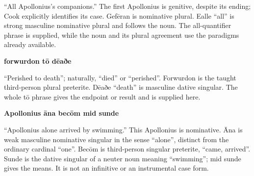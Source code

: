 “All Apollonius’s companions.” The first Apollonius is genitive, despite its ending; Cook explicitly identifies its case. Gefēran is nominative plural. Ealle “all” is strong masculine nominative plural and follows the noun. The all-quantifier phrase is supplied, while the noun and its plural agreement use the paradigms already available.

\textbf{forwurdon tō dēaðe}

“Perished to death”; naturally, “died” or “perished”. Forwurdon is the taught third-person plural preterite. Dēaðe “death” is masculine dative singular. The whole tō phrase gives the endpoint or result and is supplied here.

\textbf{Apollonius āna becōm mid sunde}

“Apollonius alone arrived by swimming.” This Apollonius is nominative. Āna is weak masculine nominative singular in the sense “alone”, distinct from the ordinary cardinal “one”. Becōm is third-person singular preterite, “came, arrived”. Sunde is the dative singular of a neuter noun meaning “swimming”; mid sunde gives the means. It is not an infinitive or an instrumental case form.

